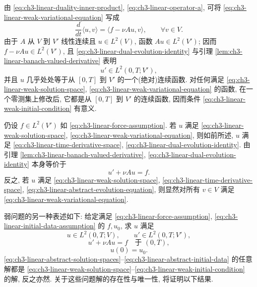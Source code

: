 由 \eqref{eq:ch3-linear-duality-inner-product}, \eqref{eq:ch3-linear-operator-a}, 可将 \eqref{eq:ch3-linear-weak-variational-equation} 写成
\begin{equation}
\frac d{dt}\langle u,v\rangle=\langle f-\nu Au,v\rangle,
\qquad\forall v\in V.
\label{eq:ch3-linear-dual-evolution-identity}
\end{equation}
由于 $A$ 从 $V$ 到 $V'$ 线性连续且 $u\in L^2(V)$, 函数 $Au\in L^2(V')$; 因而 $f-\nu Au\in L^2(V')$, 且 \eqref{eq:ch3-linear-dual-evolution-identity} 与引理 \ref{lem:ch3-linear-banach-valued-derivative} 表明
\begin{equation}
u'\in L^2(0,T;V'),
\label{eq:ch3-linear-time-derivative-space}
\end{equation}
并且 $u$ 几乎处处等于从 $[0,T]$ 到 $V'$ 的一个(绝对)连续函数. 对任何满足 \eqref{eq:ch3-linear-weak-solution-space}, \eqref{eq:ch3-linear-weak-variational-equation} 的函数, 在一个零测集上修改后, 它都是从 $[0,T]$ 到 $V'$ 的连续函数, 因而条件 \eqref{eq:ch3-linear-weak-initial-condition} 有意义.

仍设 $f\in L^2(V')$ 如 \eqref{eq:ch3-linear-force-assumption}. 若 $u$ 满足 \eqref{eq:ch3-linear-weak-solution-space}, \eqref{eq:ch3-linear-weak-variational-equation}, 则如前所述, $u$ 满足 \eqref{eq:ch3-linear-time-derivative-space}, \eqref{eq:ch3-linear-dual-evolution-identity}. 由引理 \ref{lem:ch3-linear-banach-valued-derivative}, \eqref{eq:ch3-linear-dual-evolution-identity} 本身等价于
\begin{equation}
u'+\nu Au=f.
\label{eq:ch3-linear-abstract-evolution-equation}
\end{equation}
反之, 若 $u$ 满足 \eqref{eq:ch3-linear-weak-solution-space}, \eqref{eq:ch3-linear-time-derivative-space}, \eqref{eq:ch3-linear-abstract-evolution-equation}, 则显然对所有 $v\in V$ 满足 \eqref{eq:ch3-linear-weak-variational-equation}.

弱问题的另一种表述如下: 给定满足 \eqref{eq:ch3-linear-force-assumption}, \eqref{eq:ch3-linear-initial-data-assumption} 的 $f,u_0$, 求 $u$ 满足
\begin{equation}
u\in L^2(0,T;V),
\qquad u'\in L^2(0,T;V'),
\label{eq:ch3-linear-abstract-solution-spaces}
\end{equation}
\begin{equation}
u'+\nu Au=f\quad\text{于 }(0,T),
\label{eq:ch3-linear-abstract-problem}
\end{equation}
\begin{equation}
u(0)=u_0.
\label{eq:ch3-linear-abstract-initial-data}
\end{equation}
\eqref{eq:ch3-linear-abstract-solution-spaces}--\eqref{eq:ch3-linear-abstract-initial-data} 的任意解都是 \eqref{eq:ch3-linear-weak-solution-space}--\eqref{eq:ch3-linear-weak-initial-condition} 的解, 反之亦然. 关于这些问题解的存在性与唯一性, 将证明以下结果.

